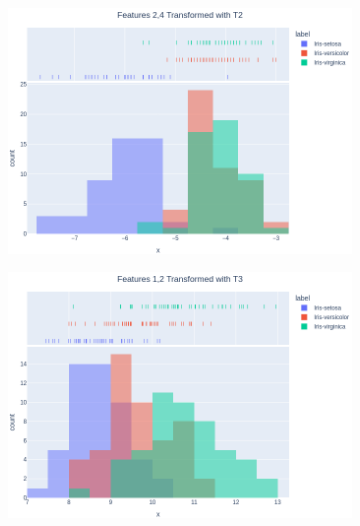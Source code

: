 \documentclass[14pt,a4]{article}
\begin{document}
\begin{figure}[h]
\begin{subfigure}{0.32\linewidth}
    \end{subfigure}
    \hfill
    \begin{subfigure}{0.32\linewidth}
        \centering
        \includegraphics[width=\linewidth]{images/q3/p2/24T2.png}
    \end{subfigure}
    \newline
    \begin{subfigure}{0.32\linewidth}
        \centering
        \includegraphics[width=\linewidth]{images/q3/p2/12T3.png}
    \end{subfigure}
    \hfill
    \begin{subfigure}{0.32\linewidth}
        \centering

\end{subfigure}
\end{figure}
\end{document}
